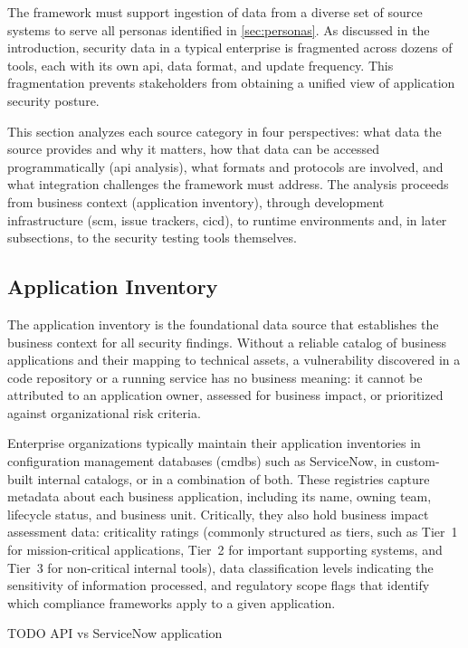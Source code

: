 The framework must support ingestion of data from a diverse set of source systems to serve all personas identified in \autoref{sec:personas}. As discussed in the introduction, security data in a typical enterprise is fragmented across dozens of tools, each with its own \gls{api}, data format, and update frequency. This fragmentation prevents stakeholders from obtaining a unified view of application security posture.

This section analyzes each source category in four perspectives: what data the source provides and why it matters, how that data can be accessed programmatically (\gls{api} analysis), what formats and protocols are involved, and what integration challenges the framework must address. The analysis proceeds from business context (application inventory), through development infrastructure (\gls{scm}, issue trackers, \gls{cicd}), to runtime environments and, in later subsections, to the security testing tools themselves.

\subsection{Application Inventory}

The application inventory is the foundational data source that establishes the business context for all security findings. Without a reliable catalog of business applications and their mapping to technical assets, a vulnerability discovered in a code repository or a running service has no business meaning: it cannot be attributed to an application owner, assessed for business impact, or prioritized against organizational risk criteria.

Enterprise organizations typically maintain their application inventories in configuration management databases (\glspl{cmdb}) such as ServiceNow, in custom-built internal catalogs, or in a combination of both. These registries capture metadata about each business application, including its name, owning team, lifecycle status, and business unit. Critically, they also hold business impact assessment data: criticality ratings (commonly structured as tiers, such as Tier~1 for mission-critical applications, Tier~2 for important supporting systems, and Tier~3 for non-critical internal tools), data classification levels indicating the sensitivity of information processed, and regulatory scope flags that identify which compliance frameworks apply to a given application.

TODO API vs ServiceNow application


